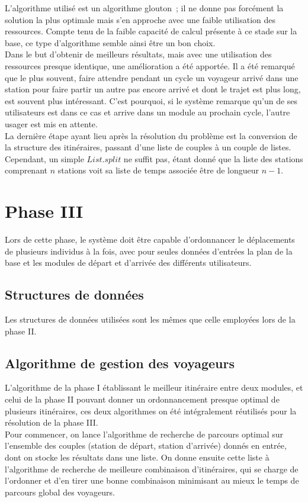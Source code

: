 \documentclass[11pt, a4paper, twoside, titlepage]{article}
\begin{document}
L'algorithme utilisé est un algorithme glouton ; il ne donne pas forcément la solution la plus optimale mais s'en approche avec une faible utilisation des ressources. Compte tenu de la faible capacité de calcul présente à ce stade sur la base, ce type d'algorithme semble ainsi être un bon choix.\\
Dans le but d'obtenir de meilleurs résultats, mais avec une utilisation des ressources presque identique, une amélioration a été apportée. Il a été remarqué que le plus souvent, faire attendre pendant un cycle un voyageur arrivé dans une station pour faire partir un autre pas encore arrivé et dont le trajet est plus long, est souvent plus intéressant. C'est pourquoi, si le système remarque qu'un de ses utilisateurs est dans ce cas et arrive dans un module au prochain cycle, l'autre usager est mis en attente.\\

La dernière étape ayant lieu après la résolution du problème est la conversion de la structure des itinéraires, passant d'une liste de couples à un couple de listes. Cependant, un simple $List.split$ ne suffit pas, étant donné que la liste des stations comprenant $n$ stations voit sa liste de temps associée être de longueur $n-1$.\\


\section{Phase III}

Lors de cette phase, le système doit être capable d'ordonnancer le déplacements de plusieurs individus à la fois, avec pour seules données d'entrées la plan de la base et les modules de départ et d'arrivée des différents utilisateurs.\\


\subsection{Structures de données}

Les structures de données utilisées sont les mêmes que celle employées lors de la phase II.\\


\subsection{Algorithme de gestion des voyageurs}

L'algorithme de la phase I établissant le meilleur itinéraire entre deux modules, et celui de la phase II pouvant donner un ordonnancement presque optimal de plusieurs itinéraires, ces deux algorithmes on été intégralement réutilisés pour la résolution de la phase III.\\
Pour commencer, on lance l'algorithme de recherche de parcours optimal sur l'ensemble des couples (station de départ, station d'arrivée) donnés en entrée, dont on stocke les résultats dans une liste. On donne ensuite cette liste à l'algorithme de recherche de meilleure combinaison d'itinéraires, qui se charge de l'ordonner et d'en tirer une bonne combinaison minimisant au mieux le temps de parcours global des voyageurs.\\
\end{document}
